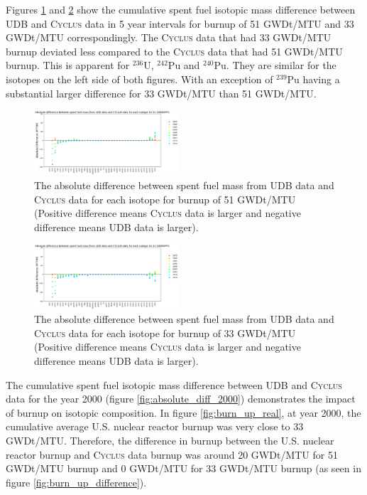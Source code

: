 \documentclass{anstrans}
\newcommand{\Cyclus}{\textsc{Cyclus}\xspace}%
\begin{document}
Figures \ref{fig:absolute_diff_all_51} and \ref{fig:absolute_diff_all_33} show 
the cumulative spent fuel isotopic mass difference between UDB and \Cyclus data 
in 5 year intervals for burnup of 51 GWDt/MTU and 33 GWDt/MTU correspondingly. 
The \Cyclus data that had 33 GWDt/MTU burnup deviated less compared to the 
\Cyclus data that had 51 GWDt/MTU burnup. This is apparent for $^{236}$U, 
$^{242}$Pu and $^{240}$Pu. They are similar for the isotopes on the left side 
of both figures. With an exception of $^{239}$Pu having a substantial larger 
difference for 33 GWDt/MTU than 51 GWDt/MTU. 

\begin{figure}[t] %
	\centering
	\includegraphics[width=0.48\textwidth]{figures/absolute_diff_all_51}
	\caption{The absolute difference between spent fuel mass from UDB data and \Cyclus data for each isotope for burnup of 51 GWDt/MTU (Positive difference means \Cyclus data is larger and negative difference means UDB data is larger).}
	\label{fig:absolute_diff_all_51}
\end{figure} 

\begin{figure}[t] %
	\centering
	\includegraphics[width=0.48\textwidth]{figures/absolute_diff_all_33}
	\caption{The absolute difference between spent fuel mass from UDB data and \Cyclus data for each isotope for burnup of 33 GWDt/MTU (Positive difference means \Cyclus data is larger and negative difference means UDB data is larger).}
	\label{fig:absolute_diff_all_33}
\end{figure} 

The 
cumulative spent fuel isotopic mass difference between UDB and \Cyclus data for 
the year 2000 (figure \ref{fig:absolute_diff_2000}) demonstrates the impact of 
burnup on isotopic composition.  In figure 
\ref{fig:burn_up_real}, at year 2000, the cumulative average U.S. nuclear 
reactor burnup was very close to 33 GWDt/MTU. Therefore, the difference in 
burnup between the U.S. nuclear reactor burnup and \Cyclus data burnup was 
around 20 GWDt/MTU for 51 GWDt/MTU burnup and 0 GWDt/MTU for 33 GWDt/MTU burnup 
(as seen in figure \ref{fig:burn_up_difference}). 
\end{document}
